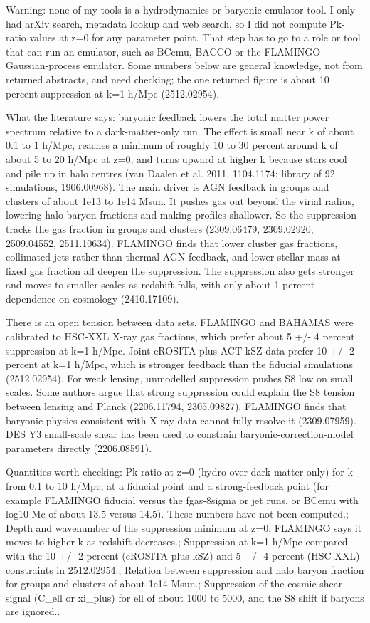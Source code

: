 \documentclass[11pt,a4paper]{article}
\begin{document}
Warning: none of my tools is a hydrodynamics or baryonic-emulator tool. I only had arXiv search, metadata lookup and web search, so I did not compute Pk-ratio values at z=0 for any parameter point. That step has to go to a role or tool that can run an emulator, such as BCemu, BACCO or the FLAMINGO Gaussian-process emulator. Some numbers below are general knowledge, not from returned abstracts, and need checking; the one returned figure is about 10 percent suppression at k=1 h/Mpc (2512.02954).

What the literature says: baryonic feedback lowers the total matter power spectrum relative to a dark-matter-only run. The effect is small near k of about 0.1 to 1 h/Mpc, reaches a minimum of roughly 10 to 30 percent around k of about 5 to 20 h/Mpc at z=0, and turns upward at higher k because stars cool and pile up in halo centres (van Daalen et al. 2011, 1104.1174; library of 92 simulations, 1906.00968). The main driver is AGN feedback in groups and clusters of about 1e13 to 1e14 Msun. It pushes gas out beyond the virial radius, lowering halo baryon fractions and making profiles shallower. So the suppression tracks the gas fraction in groups and clusters (2309.06479, 2309.02920, 2509.04552, 2511.10634). FLAMINGO finds that lower cluster gas fractions, collimated jets rather than thermal AGN feedback, and lower stellar mass at fixed gas fraction all deepen the suppression. The suppression also gets stronger and moves to smaller scales as redshift falls, with only about 1 percent dependence on cosmology (2410.17109).

There is an open tension between data sets. FLAMINGO and BAHAMAS were calibrated to HSC-XXL X-ray gas fractions, which prefer about 5 +/- 4 percent suppression at k=1 h/Mpc. Joint eROSITA plus ACT kSZ data prefer 10 +/- 2 percent at k=1 h/Mpc, which is stronger feedback than the fiducial simulations (2512.02954). For weak lensing, unmodelled suppression pushes S8 low on small scales. Some authors argue that strong suppression could explain the S8 tension between lensing and Planck (2206.11794, 2305.09827). FLAMINGO finds that baryonic physics consistent with X-ray data cannot fully resolve it (2309.07959). DES Y3 small-scale shear has been used to constrain baryonic-correction-model parameters directly (2206.08591).

Quantities worth checking: Pk ratio at z=0 (hydro over dark-matter-only) for k from 0.1 to 10 h/Mpc, at a fiducial point and a strong-feedback point (for example FLAMINGO fiducial versus the fgas-8sigma or jet runs, or BCemu with log10 Mc of about 13.5 versus 14.5). These numbers have not been computed.; Depth and wavenumber of the suppression minimum at z=0; FLAMINGO says it moves to higher k as redshift decreases.; Suppression at k=1 h/Mpc compared with the 10 +/- 2 percent (eROSITA plus kSZ) and 5 +/- 4 percent (HSC-XXL) constraints in 2512.02954.; Relation between suppression and halo baryon fraction for groups and clusters of about 1e14 Msun.; Suppression of the cosmic shear signal (C\_ell or xi\_plus) for ell of about 1000 to 5000, and the S8 shift if baryons are ignored..
\end{document}
